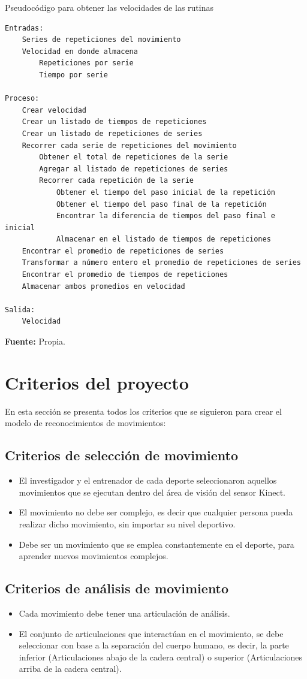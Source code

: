 \begin{code}[H]
	\caption{Pseudoc\'odigo para obtener las velocidades de las rutinas}
	\label{code:getTimeOfRepetitions}
	\begin{lstlisting}
Entradas:
	Series de repeticiones del movimiento
	Velocidad en donde almacena
		Repeticiones por serie
		Tiempo por serie
		
Proceso:
	Crear velocidad
	Crear un listado de tiempos de repeticiones
	Crear un listado de repeticiones de series
	Recorrer cada serie de repeticiones del movimiento
		Obtener el total de repeticiones de la serie
		Agregar al listado de repeticiones de series
		Recorrer cada repetición de la serie
			Obtener el tiempo del paso inicial de la repetición
			Obtener el tiempo del paso final de la repetición
			Encontrar la diferencia de tiempos del paso final e inicial
			Almacenar en el listado de tiempos de repeticiones
	Encontrar el promedio de repeticiones de series
	Transformar a número entero el promedio de repeticiones de series
	Encontrar el promedio de tiempos de repeticiones
	Almacenar ambos promedios en velocidad
	
Salida:
	Velocidad
	\end{lstlisting}
	\textbf{Fuente:} Propia.
\end{code} 
\section{Criterios del proyecto}\label{criter}
En esta secci\'on se presenta todos los criterios que se siguieron para crear el modelo de reconocimientos de movimientos:
\subsection{Criterios de selecci\'on de movimiento}
\begin{itemize}
	\item El investigador y el entrenador de cada deporte  seleccionaron aquellos movimientos que se ejecutan dentro del \'area de visi\'on del sensor Kinect.
	\item El movimiento no debe ser complejo, es decir que cualquier persona pueda realizar dicho movimiento, sin importar su nivel deportivo.
	\item Debe ser un movimiento que se emplea constantemente en el deporte, para aprender nuevos movimientos complejos.
\end{itemize}
\subsection{Criterios de an\'alisis de movimiento}
\begin{itemize}
	\item Cada movimiento debe tener una articulaci\'on de an\'alisis.
	\item El conjunto de articulaciones que interact\'uan en el movimiento, se debe seleccionar con base a la separaci\'on del cuerpo humano, es decir, la parte inferior (Articulaciones abajo de la cadera central) o superior (Articulaciones arriba de la cadera central).
\end{itemize}
